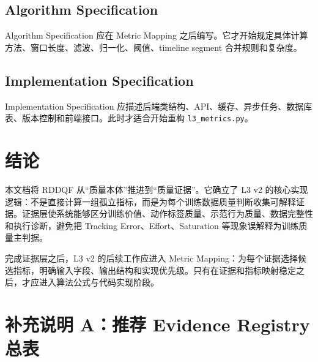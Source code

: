 \documentclass[UTF8,zihao=-4,oneside,openany]{ctexrep}
\newcommand{\Code}[1]{\texttt{#1}}
\begin{document}
\subsection{Algorithm Specification}

Algorithm Specification 应在 Metric Mapping 之后编写。它才开始规定具体计算方法、窗口长度、滤波、归一化、阈值、timeline segment 合并规则和复杂度。

\subsection{Implementation Specification}

Implementation Specification 应描述后端类结构、API、缓存、异步任务、数据库表、版本控制和前端接口。此时才适合开始重构 \Code{l3\_metrics.py}。

\section{结论}

本文档将 RDDQF 从“质量本体”推进到“质量证据”。它确立了 L3 v2 的核心实现逻辑：不是直接计算一组孤立指标，而是为每个训练数据质量判断收集可解释证据。证据层使系统能够区分训练价值、动作标签质量、示范行为质量、数据完整性和执行诊断，避免把 Tracking Error、Effort、Saturation 等现象误解释为训练质量主判据。

完成证据层之后，L3 v2 的后续工作应进入 Metric Mapping：为每个证据选择候选指标，明确输入字段、输出结构和实现优先级。只有在证据和指标映射稳定之后，才应进入算法公式与代码实现阶段。

\section{补充说明 A：推荐 Evidence Registry 总表}
\end{document}
